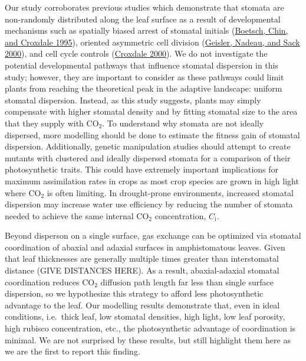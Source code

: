 \documentclass[12pt,halfline,a4paper,]{ouparticle}
\begin{document}
Our study corroborates previous studies which demonstrate that stomata
are non-randomly distributed along the leaf surface as a result of
developmental mechanisms such as spatially biased arrest of stomatal
initials (\protect\hyperlink{ref-boetsch_arrest_1995}{Boetsch, Chin, and
Croxdale 1995}), oriented asymmetric cell division
(\protect\hyperlink{ref-geisler_oriented_2000}{Geisler, Nadeau, and Sack
2000}), and cell cycle controls
(\protect\hyperlink{ref-croxdale_stomatal_2000}{Croxdale 2000}). We do
not investigate the potential developmental pathways that influence
stomatal dispersion in this study; however, they are important to
consider as these pathways could limit plants from reaching the
theoretical peak in the adaptive landscape: uniform stomatal dispersion.
Instead, as this study suggests, plants may simply compensate with
higher stomatal density and by fitting stomatal size to the area that
they supply with CO\(_2\). To understand why stomata are not ideally
dispersed, more modelling should be done to estimate the fitness gain of
stomatal dispersion. Additionally, genetic manipulation studies should
attempt to create mutants with clustered and ideally dispersed stomata
for a comparison of their photosynthetic traits. This could have
extremely important implications for maximum assimilation rates in crops
as most crop species are grown in high light where CO\(_2\) is often
limiting. In drought-prone environments, increased stomatal dispersion
may increase water use efficiency by reducing the number of stomata
needed to achieve the same internal CO\(_2\) concentration,
\(C_\text{i}\).

Beyond disperson on a single surface, gas exchange can be optimized via
stomatal coordination of abaxial and adaxial surfaces in amphistomatous
leaves. Given that leaf thicknesses are generally multiple times greater
than interstomatal distance (GIVE DISTANCES HERE). As a result,
abaxial-adaxial stomatal coordination reduces CO\(_2\) diffusion path
length far less than single surface dispersion, so we hypothesize this
strategy to afford less photosynthetic advantage to the leaf. Our
modelling results demonstrate that, even in ideal conditions, i.e.~thick
leaf, low stomatal densities, high light, low leaf porosity, high
rubisco concentration, etc., the photosynthetic advantage of
coordination is minimal. We are not surprised by these results, but
still highlight them here as we are the first to report this finding.
\end{document}
